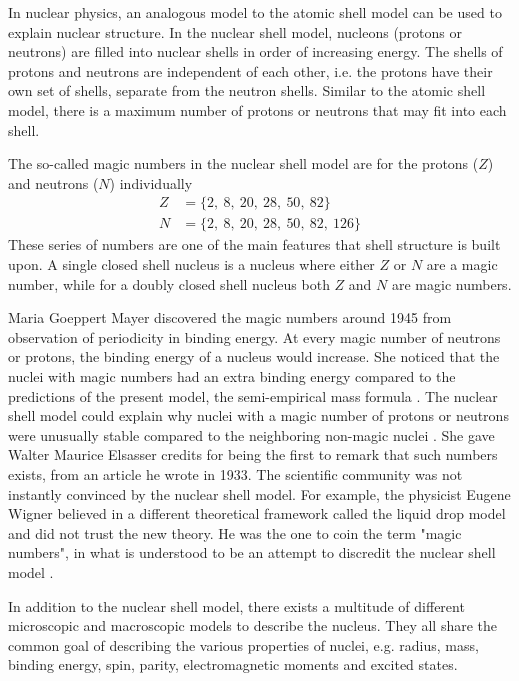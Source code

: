 \documentclass[twoside,english]{uiofysmaster/uiofysmaster}
\begin{document}
In nuclear physics, an analogous model to the atomic shell model can be used to explain nuclear structure.
In the nuclear shell model, nucleons (protons or neutrons) are filled into nuclear shells in order of increasing energy. 
The shells of protons and neutrons are independent of each other, i.e. the protons have their own set of shells, separate from the neutron shells.
Similar to the atomic shell model, there is a maximum number of protons or neutrons that may fit into each shell. 
 
The so-called magic numbers in the nuclear shell model are for the protons ($Z$) and neutrons ($N$) individually
\begin{align*}
	Z &= \{ 2, ~8, ~20, ~28, ~50, ~82 \} \\
	N &= \{ 2, ~8, ~20, ~28, ~50, ~82, ~126 \}
\end{align*}
These series of numbers are one of the main features that shell structure is built upon. 
A single closed shell nucleus is a nucleus where either $Z$ or $N$ are a magic number, while for a doubly closed shell nucleus both $Z$ and $N$ are magic numbers. 

Maria Goeppert Mayer discovered the magic numbers around 1945 from observation of periodicity in binding energy. 
At every magic number of neutrons or protons, the binding energy of a nucleus would increase. 
She noticed that the nuclei with magic numbers had an extra binding energy compared to the predictions of the present model, the semi-empirical mass formula \cite{NR}. 
The nuclear shell model could explain why nuclei with a magic number of protons or neutrons were unusually stable compared to the neighboring non-magic nuclei \cite{Mayer1964}. 
She gave Walter Maurice Elsasser credits for being the first to remark that such numbers exists, from an article he wrote in 1933. 
The scientific community was not instantly convinced by the nuclear shell model.
For example, the physicist Eugene Wigner believed in a different theoretical framework called the liquid drop model and did not trust the new theory. 
He was the one to coin the term "magic numbers", in what is understood to be an attempt to discredit the nuclear shell model \cite{Mayer1964, MIT-OCW}.

In addition to the nuclear shell model, there exists a multitude of different microscopic and macroscopic models to describe the nucleus. 
They all share the common goal of describing the various properties of nuclei, e.g. radius, mass, binding energy, spin, parity, electromagnetic moments and excited states.
\end{document}
